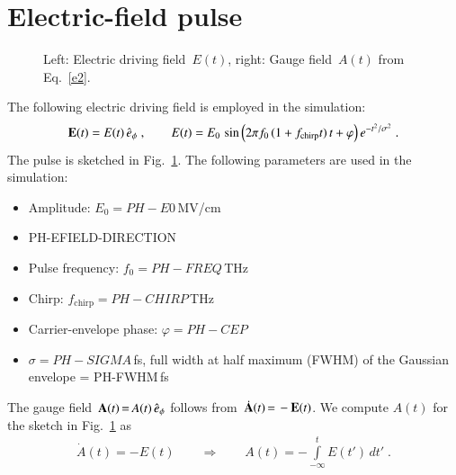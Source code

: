 \documentclass[11pt, a4paper]{scrartcl}
\newlength\figureheight
\newlength\figurewidth
\begin{document}
\section{Electric-field pulse}
\begin{figure}[b!]
\centering
\setlength\figureheight{7.5cm} 
\setlength\figurewidth{7.5cm}
\hfill
\caption{Left: Electric driving field~$E(t)$, right: Gauge field~$A(t)$ from Eq.~\eqref{e2}.}
    \label{fig:Efield}
\end{figure}
\iftrue
The following electric driving field is employed in the simulation:
\begin{align}
    \mathbf{E}(t)  = E(t)\,\hat{e}_\phi
    \;,\hspace{2em}
    E(t) = E_0\,    \sin\Big(2\pi f_0\,(1+f_\text{chirp} t)\,t + \varphi\Big)\, e^{-t^2/\sigma^2}\;.
    \label{e1}
\end{align}
The pulse is sketched in Fig.~\ref{fig:Efield}. 
%
The following parameters are used in the simulation:
\begin{itemize}
    \item Amplitude: $E_0 = PH-E0$\,MV/cm
    \item PH-EFIELD-DIRECTION
    \item Pulse frequency: $f_0 = PH-FREQ$\,THz
    \item Chirp: $f_\text{chirp} = PH-CHIRP$\,THz
    \item Carrier-envelope phase: $\varphi = PH-CEP$
    \item $\sigma = PH-SIGMA$\,fs, full width at half maximum (FWHM) of the Gaussian envelope = PH-FWHM\,fs
\end{itemize}
\else 
A user-defined pulse is used. 
%
It is sketched in Fig.~\ref{fig:Efield}. 
\fi
The gauge field~$\mathbf{A}(t)\,{=}\, A(t)\,\hat{e}_\phi$ follows from~$\dot{\mathbf{A}}(t)\,{=}\, -\mathbf{E}(t)$. We compute $A(t)$ for the sketch in Fig.~\ref{fig:Efield} as
\begin{align}
    \dot A(t) = -E(t) \hspace{2em}\Rightarrow\hspace{2em}
    A(t) = -\int\limits_{-\infty}^t E(t')\,dt'\;. \label{e2}
\end{align}
\end{document}
